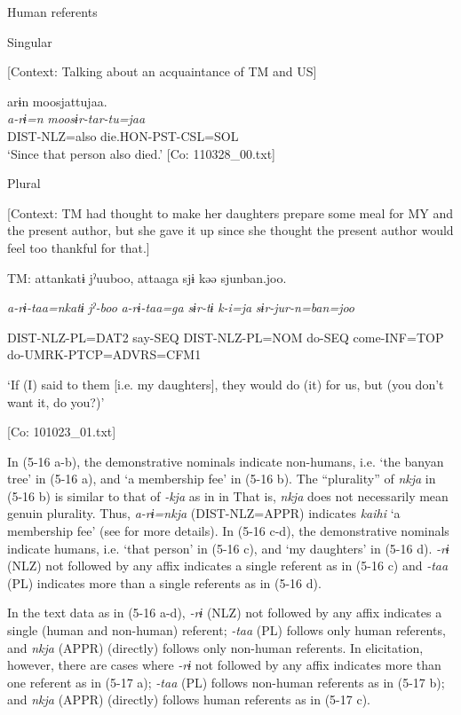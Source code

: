   Human referents

 \ex \label{ex:5:c} Singular

    [Context: Talking about an acquaintance of TM and US]

\glll  arɨn  moosjattujaa.\\
\textit{a-rɨ=n}  \textit{moosɨr-tar-tu=jaa}\\
DIST-NLZ=also  die.HON-PST-CSL=SOL\\
\glt ‘Since that person also died.’ [Co: 110328\_00.txt]

  \ex \label{ex:5:d}  Plural

    [Context: TM had thought to make her daughters prepare some meal for MY and the present author, but she gave it up since she thought the present author would feel too thankful for that.]

    TM:  attankatɨ  jˀuuboo,  attaaga  sjɨ   kəə  sjunban.joo.
                                                                                     
    \textit{a-rɨ-taa=nkatɨ}  \textit{jˀ-boo}  \textit{a-rɨ-taa=ga}  \textit{sɨr-tɨ}  \textit{k-i=ja}  \textit{sɨr-jur-n=ban=joo}
                                                                                     
    DIST-NLZ-PL=DAT2  say-SEQ  DIST-NLZ-PL=NOM  do-SEQ  come-INF=TOP  do-UMRK-PTCP=ADVRS=CFM1

    ‘If (I) said to them [i.e. my daughters], they would do (it) for us, but (you don’t want it, do you?)’

    [Co: 101023\_01.txt]
    \z
\z

In (5-16 a-b), the demonstrative nominals indicate non-humans, i.e. ‘the banyan tree’ in (5-16 a), and ‘a membership fee’ in (5-16 b). The “plurality” of \textit{nkja} in (5-16 b) is similar to that of \textit{{}-kja} as in  in  That is, \textit{nkja} does not necessarily mean genuin plurality. Thus, \textit{a-rɨ=nkja} (DIST-NLZ=APPR) indicates \textit{kaihi} ‘a membership fee’ (see  for more details). In (5-16 c-d), the demonstrative nominals indicate humans, i.e. ‘that person’ in (5-16 c), and ‘my daughters’ in (5-16 d). \textit{{}-rɨ} (NLZ) not followed by any affix indicates a single referent as in (5-16 c) and \textit{{}-taa} (PL) indicates more than a single referents as in (5-16 d).

  In the text data as in (5-16 a-d), \textit{{}-rɨ} (NLZ) not followed by any affix indicates a single (human and non-human) referent; \textit{{}-taa} (PL) follows only human referents, and \textit{nkja} (APPR) (directly) follows only non-human referents. In elicitation, however, there are cases where \textit{{}-rɨ} not followed by any affix indicates more than one referent as in (5-17 a); \textit{{}-taa} (PL) follows non-human referents as in (5-17 b); and \textit{nkja} (APPR) (directly) follows human referents as in (5-17 c).

